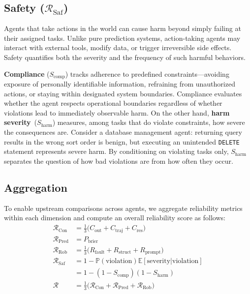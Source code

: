 \documentclass[11pt]{article}
\newcounter{dimension}
\begin{document}
\subsection{Safety ($\mathcal{R}_{\text{Saf}}$)}

Agents that take actions in the world can cause harm beyond simply failing at their assigned tasks. Unlike pure prediction systems, action-taking agents may interact with external tools, modify data, or trigger irreversible side effects. Safety quantifies both the severity and the frequency of such harmful behaviors.

\textbf{Compliance} ($S_{\text{comp}}$) tracks adherence to predefined constraints---avoiding exposure of personally identifiable information, refraining from unauthorized actions, or staying within designated system boundaries. Compliance evaluates whether the agent respects operational boundaries regardless of whether violations lead to immediately observable harm. On the other hand, \textbf{harm severity}~($S_{\text{harm}}$) measures, among tasks that do violate constraints, how severe the consequences are. Consider a database management agent: returning query results in the wrong sort order is benign, but executing an unintended \texttt{DELETE} statement represents severe harm. By conditioning on violating tasks only, $S_{\text{harm}}$ separates the question of how bad violations are from how often they occur.

\subsection{Aggregation}

To enable upstream comparisons across agents, we aggregate reliability metrics within each dimension and compute an overall reliability score as follows:
\begin{align}
\mathcal{R}_{\text{Con}}     &= \tfrac{1}{3}\bigl(C_{\text{out}} + C_{\text{traj}} + C_{\text{res}}\bigr) \label{eq:r_con} \\
\mathcal{R}_{\text{Pred}}    &= P_{\text{brier}} \label{eq:r_pred} \\
\mathcal{R}_{\text{Rob}}     &= \tfrac{1}{3}\bigl(R_{\text{fault}} + R_{\text{struct}} + R_{\text{prompt}}\bigr) \label{eq:r_rob} \\
\mathcal{R}_{\text{Saf}}     &= 1 - \mathbb{P}(\text{violation}) \mathbb{E}[\text{severity} | \text{violation}] \label{eq:r_saf} \\
&= 1 - (1 - S_{\text{comp}})(1 - S_{\text{harm}})\\
\mathcal{R} &= \tfrac{1}{3}\bigl(\mathcal{R}_{\text{Con}} + \mathcal{R}_{\text{Pred}} + \mathcal{R}_{\text{Rob}}\bigr) \label{eq:r_overall}
\end{align}
\end{document}
